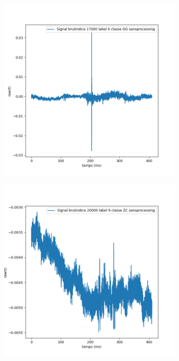 \begin{figure}[!h]
\centering
	\begin{subfigure}[b]{0.3\textwidth}
    \includegraphics[width=\textwidth]{./images/indice17000Spectro1Dlabel0classeGGsansprocessingsanszoom.png}
    \caption{}
  	\end{subfigure}
  	\begin{subfigure}[b]{0.3\textwidth}
    \includegraphics[width=\textwidth]{./images/indice20000Spectro1Dlabel9classeZCsansprocessingsanszoom.png}

\end{subfigure}
\end{figure}
